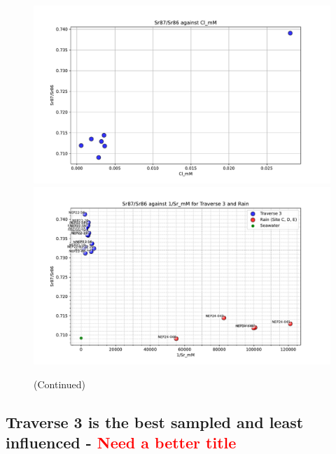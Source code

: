 \begin{figure}[p]\ContinuedFloat
    \includegraphics[width=\textwidth]{Sr87_Sr86_Cl.pdf}
    \includegraphics[width=\textwidth]{Sr87_Sr86_1Sr_Rain.pdf}
    \caption[]{(Continued)}
\end{figure}

\FloatBarrier



\newpage

\subsection{Traverse 3 is the best sampled and least influenced - \textcolor{red}{Need a better title}}

